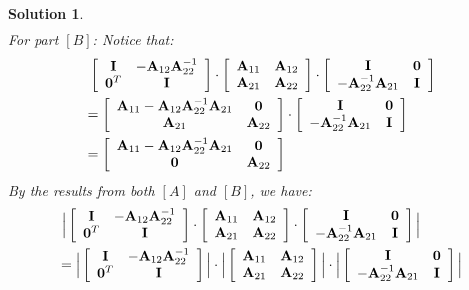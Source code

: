 \documentclass[11pt]{article}
\newtheorem{sol}{Solution}
\begin{document}
\begin{sol}
\begin{align*}
	\end{align*}
	\vskip 2mm
	For part $[B]$:\vskip 2mm
	Notice that:
	\begin{align*}
		&\ \left[\begin{array}{cc} {\bf I}&-{\bf A}_{12}{\bf A}_{22}^{-1} \\ {\bf 0}^T &{\bf I} \end{array}\right]\cdot \left[\begin{array}{cc} {\bf A}_{11}&{\bf A}_{12} \\ {\bf A}_{21}&{\bf A}_{22} \end{array}\right]\cdot \left[\begin{array}{cc} {\bf I}&{\bf 0} \\{\bf -A}_{22}^{-1}{\bf A}_{21} &{\bf I} \end{array}\right] \\
		&= \left[\begin{array}{cc} {\bf A}_{11}- {\bf A}_{12}{\bf A}_{22}^{-1}{\bf A}_{21}&{\bf 0} \\ {\bf A}_{21}&{\bf A}_{22} \end{array}\right]\cdot \left[\begin{array}{cc} {\bf I}& {\bf 0}\\ -{\bf A}_{22}^{-1}{\bf A}_{21}&{\bf I} \end{array}\right]\\
		&= \left[\begin{array}{cc} {\bf A}_{11} - {\bf A}_{12}{\bf A}_{22}^{-1}{\bf A}_{21}& {\bf 0}\\ {\bf 0}&{\bf A}_{22} \end{array}\right]
	\end{align*}	
	By the results from both $[A]$ and $[B]$, we have:
	\begin{align*}
		&\ \Big|\left[\begin{array}{cc} {\bf I}&-{\bf A}_{12}{\bf A}_{22}^{-1} \\ {\bf 0}^T &{\bf I} \end{array}\right]\cdot \left[\begin{array}{cc} {\bf A}_{11}&{\bf A}_{12} \\ {\bf A}_{21}&{\bf A}_{22} \end{array}\right]\cdot \left[\begin{array}{cc} {\bf I}&{\bf 0} \\{\bf -A}_{22}^{-1}{\bf A}_{21} &{\bf I} \end{array}\right]\Big|\\
		&= \Big|\left[\begin{array}{cc} {\bf I}&-{\bf A}_{12}{\bf A}_{22}^{-1} \\ {\bf 0}^T &{\bf I} \end{array}\right]\Big|\cdot \Big|\left[\begin{array}{cc} {\bf A}_{11}&{\bf A}_{12} \\ {\bf A}_{21}&{\bf A}_{22} \end{array}\right]\Big|\cdot \Big| \left[\begin{array}{cc} {\bf I}&{\bf 0} \\{\bf -A}_{22}^{-1}{\bf A}_{21} &{\bf I} \end{array}\right]\Big|\\

\end{align*}
\end{sol}
\end{document}
